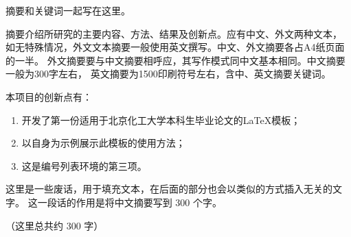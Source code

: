 

\begin{cabstract}
	摘要和关键词一起写在这里。

	摘要介绍所研究的主要内容、方法、结果及创新点。应有中文、外文两种文本，
	如无特殊情况，外文文本摘要一般使用英文撰写。中文、外文摘要各占A4纸页面的一半。
	外文摘要要与中文摘要相呼应，其写作模式同中文基本相同。中文摘要一般为300字左右，
	英文摘要为1500印刷符号左右，含中、英文摘要关键词。

	本项目的创新点有：
	\begin{enumerate}
		\item 开发了第一份适用于北京化工大学本科生毕业论文的\LaTeX{}模板；
		\item 以自身为示例展示此模板的使用方法；
		\item 这是编号列表环境的第三项。
	\end{enumerate}

	这里是一些废话，用于填充文本，在后面的部分也会以类似的方式插入无关的文字。
	这一段话的作用是将中文摘要写到 300 个字。

	（这里总共约 300 字）
\end{cabstract}

